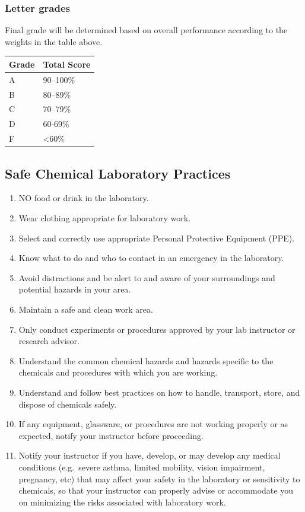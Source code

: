 \subsubsection{Letter grades}\label{letter-grades}

Final grade will be determined based on overall performance according to
the weights in the table above.

\begin{longtable}[]{@{}ll@{}}
\toprule\noalign{}
Grade & Total Score \\
\midrule\noalign{}
\endhead
\bottomrule\noalign{}
\endlastfoot
A & 90--100\% \\
B & 80--89\% \\
C & 70--79\% \\
D & 60-69\% \\
F & \textless60\% \\
\end{longtable}

\subsection{Safe Chemical Laboratory
Practices}\label{safe-chemical-laboratory-practices}

\begin{enumerate}
\def\labelenumi{\arabic{enumi}.}
\tightlist
\item
  NO food or drink in the laboratory.
\item
  Wear clothing appropriate for laboratory work.
\item
  Select and correctly use appropriate Personal Protective Equipment
  (PPE).
\item
  Know what to do and who to contact in an emergency in the laboratory.
\item
  Avoid distractions and be alert to and aware of your surroundings and
  potential hazards in your area.
\item
  Maintain a safe and clean work area.
\item
  Only conduct experiments or procedures approved by your lab instructor
  or research advisor.
\item
  Understand the common chemical hazards and hazards specific to the
  chemicals and procedures with which you are working.
\item
  Understand and follow best practices on how to handle, transport,
  store, and dispose of chemicals safely.
\item
  If any equipment, glassware, or procedures are not working properly or
  as expected, notify your instructor before proceeding.
\item
  Notify your instructor if you have, develop, or may develop any
  medical conditions (e.g.~severe asthma, limited mobility, vision
  impairment, pregnancy, etc) that may affect your safety in the
  laboratory or sensitivity to chemicals, so that your instructor can
  properly advise or accommodate you on minimizing the risks associated
  with laboratory work.
\end{enumerate}

